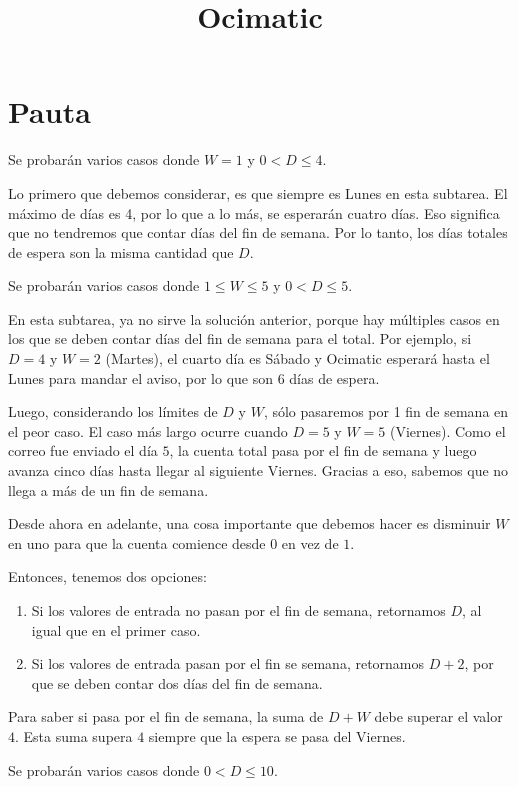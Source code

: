 \documentclass{oci}
\title{Ocimatic}
\begin{document}
\section*{Pauta}
\begin{scoreDescription}
   Se probarán varios casos donde $W=1$ y $0 < D \leq 4$.

  Lo primero que debemos considerar, es que siempre es Lunes en esta subtarea.
  El máximo de días es 4, por lo que a lo más, se esperarán cuatro días. Eso
  significa que no tendremos que contar días del fin de semana. Por lo tanto, los
  días totales de espera son la misma cantidad que $D$.
  
  \vspace{10mm}
   Se probarán varios casos donde $1 \leq W \leq 5$ y $0 < D \leq 5$.

  En esta subtarea, ya no sirve la soluci\'on anterior, porque hay m\'ultiples casos
  en los que se deben contar d\'ias del fin de semana para el total. Por ejemplo, si 
  $D = 4$ y $W = 2$ (Martes), el cuarto d\'ia es S\'abado y Ocimatic esperar\'a hasta
  el Lunes para mandar el aviso, por lo que son 6 d\'ias de espera.
  
  Luego, considerando los l\'imites de $D$ y $W$, s\'olo pasaremos por 1 fin 
  de semana en el peor caso. El caso m\'as largo ocurre cuando $D = 5$ y $W = 5$ (Viernes).
  Como el correo fue enviado el d\'ia $5$, la cuenta total pasa por el fin de semana
  y luego avanza cinco d\'ias hasta llegar al siguiente Viernes. Gracias a eso, sabemos
  que no llega a m\'as de un fin de semana.

  Desde ahora en adelante, una cosa importante que debemos hacer es disminuir $W$ en uno para 
  que la cuenta comience desde $0$ en vez de $1$.
  
  Entonces, tenemos dos opciones:
  \begin{enumerate}
    \item Si los valores de entrada no pasan por el fin de semana, retornamos $D$, al igual que en el primer caso.
    \item Si los valores de entrada pasan por el fin se semana, retornamos $D+2$, por que se deben contar dos d\'ias del fin de semana.
  \end{enumerate}

  Para saber si pasa por el fin de semana, la suma de $D + W$ debe superar el valor $4$.
  Esta suma supera $4$ siempre que la espera se pasa del Viernes.

  \vspace{10mm}
   Se probarán varios casos donde $0 < D \leq 10$.


\end{scoreDescription}
\end{document}
